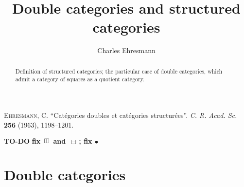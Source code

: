 \documentclass{article}
\title{Double categories and structured categories}
\author{Charles Ehresmann}
\date{}
\newcommand{\origcit}{%
  \textsc{Ehresmann, C.}
  ``Catégories doubles et catégories structurées''.
  \emph{C. R. Acad. Sc.} \textbf{256} (1963), 1198--1201.
}
\newcommand{\oldpage}[1]{\marginpar{\footnotesize$\Big\vert$ \textit{p.~#1}}}
\newcommand{\todo}{{\color{purple}\textbf{TO-DO }}}
\newcommand{\unsure}[1]{{\color{purple}\textbf{#1}}}
\newcommand{\dotc}{{\mathbin{\bullet}}}
\newcommand{\vmult}{{\,\rotatebox{90}{$\boxminus$}\,}}
\newcommand{\hmult}{{\,\boxminus\,}}
\begin{document}
\maketitle
\origcit

\begin{abstract}
  Definition of structured categories; the particular case of double categories, which admit a category of squares as a quotient category.
\end{abstract}


\todo \unsure{fix $\vmult$ and $\hmult$; fix $\dotc$}

\section{Double categories}
\oldpage{1}
\end{document}
